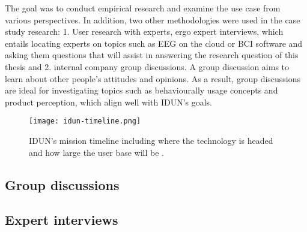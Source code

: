 The goal was to conduct empirical research and examine the use case from various perspectives. In addition, two other methodologies were used in the case study research: 1. User research with experts, ergo expert interviews, which entails locating experts on topics such as EEG on the cloud or BCI software and asking them questions that will assist in answering the research question of this thesis and 2. internal company group discussions. A group discussion aims to learn about other people's attitudes and opinions. As a result, group discussions are ideal for investigating topics such as behaviourally usage concepts and product perception, which align well with IDUN's goals.

\begin{figure}[!ht]
  \centering
  \texttt{[image: idun-timeline.png]}
  \caption{IDUN's mission timeline including where the technology is headed and how large the user base will be \citep{idun_guardian_nodate}.}
  \label{fig:idun-timeline}
\end{figure}



\subsection{Group discussions}
\label{chapter3-group-discussions}

\subsection{Expert interviews}
\label{chapter3-expert-interviews}

